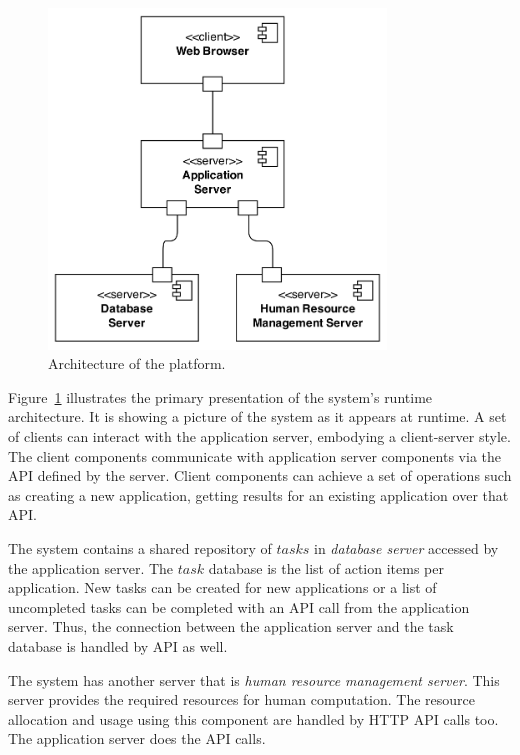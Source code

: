 \begin{figure}[ht]
	\centering
	\includegraphics[width=0.8\textwidth]{figures/architecture/CC1.png}
	\caption{Architecture of the platform.}
	\label{fig:arch}
\end{figure}

Figure~\ref{fig:arch} illustrates the primary presentation of the system's 
runtime architecture. It is showing a picture of the system as it appears at runtime. 
A set of clients can interact with the application server, embodying a client-server 
style. The client components communicate with application server components 
via the API defined by the server. Client components can achieve a set of operations 
such as creating a new application, getting results for an existing application over that API.

The system contains a shared repository of $tasks$ in \textit{database server} 
accessed by the application server. The $task$ database is the list of action 
items per application. New tasks can be created for new applications or a 
list of uncompleted tasks can be completed 
with an API call from the application server. Thus, the connection between the 
application server and the task database is handled by API as well.

The system has another server that is \textit{human resource management server}. This 
server provides the required resources for human computation. The resource 
allocation and usage using this component are handled by HTTP API calls too. 
The application server does the API calls.

